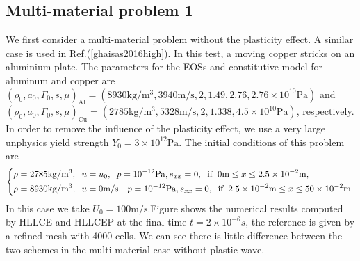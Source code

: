 \documentclass{article}
\numberwithin{equation}{section}
\numberwithin{table}{section}
\begin{document}
\subsection{Multi-material problem 1}
We first consider a multi-material problem without the plasticity effect. A similar case is used in Ref.(\ref{ghaisas2016high}). In this test, a moving  copper stricks on an aluminium plate. The parameters for the EOSs and constitutive model for aluminum and copper  are  
$ (\rho_0, a_0, \Gamma_0, s, \mu)_{\text{Al}} =(8930 \text{kg}/\text{m}^3, 3940 \text{m}/\text{s},2, 1.49, 2.76 ,2.76\times 10^{10} \text{Pa} )$ and   $(\rho_0, a_0, \Gamma_0, s, \mu)_{\text{Cu}} =(2785 \text{kg}/\text{m}^3, 5328 \text{m}/\text{s},2, 1.338,4.5\times 10^{10}\text{Pa})$, respectively. In order to remove the influence of the plasticity effect, we use a very large unphysics yield strength $Y_0 = 3\times 10^{12} \text{Pa}$.  The initial conditions of this problem are  
\begin{equation}\label{eq:init_multi}
  \left\{ \begin{aligned}
	& \rho = 2785 \text{kg}/\text{m}^3, \hspace{0.2cm} u = u_0, \hspace{0.2cm} p = 10^{-12}\text{Pa}, s_{xx} = 0, \hspace{0.2cm} \text{if} \hspace{0.2cm} 0\text{m} \le x \le 2.5\times 10^{-2} \text{m},\\
	&  \rho = 8930 \text{kg}/\text{m}^3, \hspace{0.2cm} u = 0\text{m}/\text{s}, \hspace{0.2cm} p = 10^{-12}\text{Pa}, s_{xx} = 0, \hspace{0.2cm} \text{if} \hspace{0.2cm} 2.5 \times 10^{-2}\text{m} \le x \le 50\times 10^{-2} \text{m}.\\
	\end{aligned}
  \right.
\end{equation}
In this case we take $U_0 = 100 \text{m}/\text{s}$.Figure  shows  the numerical results computed by HLLCE and HLLCEP at the final time $ t= 2 \times 10^{-6}s$, the reference is given by a refined mesh  with 4000 cells.  We can see there is little difference between the two schemes  in  the multi-material case without plastic wave.     
\end{document}
